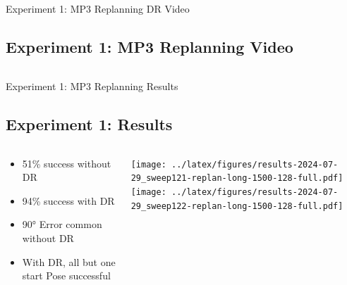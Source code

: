 \documentclass[16:9,en,navbarinfooter]{sdqbeamer}
\begin{document}
\begin{frame}{Experiment 1: MP3 Replanning DR Video}
	\subsection{Experiment 1: MP3 Replanning Video}

	\begin{columns}[t]
		\vspace{1cm}



	\end{columns}
\end{frame}
\begin{frame}{Experiment 1: MP3 Replanning Results}
	\subsection{Experiment 1: Results}

	\begin{columns}[t]
		\begin{column}{0.3\textwidth}
			\vspace{1cm}
			\begin{itemize}
				\item 51\% success without DR
				\item 94\% success with DR
				\item 90° Error common without DR
				\item With DR, all but one start Pose successful
			\end{itemize}
		\end{column}
		\begin{column}{0.7\textwidth}
			\vspace{1cm}
			\texttt{[image: ../latex/figures/results-2024-07-29\_sweep121-replan-long-1500-128-full.pdf]}\\
			\texttt{[image: ../latex/figures/results-2024-07-29\_sweep122-replan-long-1500-128-full.pdf]}
		\end{column}
	\end{columns}
\end{frame}
\end{document}
